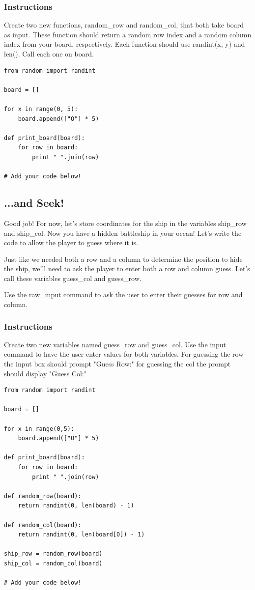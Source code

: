 \documentclass[12pt,a4paper,final,twoside,onecolumn,titlepage]{book}
\begin{document}
\subsubsection{Instructions}

Create two new functions, random\_row and random\_col, that both take board as input. These function should return a random row index and a random column index from your board, respectively. Each function should use randint(x, y) and len(). Call each one on board.

\begin{lstlisting}
from random import randint 

board = []

for x in range(0, 5):
    board.append(["O"] * 5)

def print_board(board):
    for row in board:
        print " ".join(row)

# Add your code below!
\end{lstlisting}

\subsection{...and Seek!}

Good job! For now, let's store coordinates for the ship in the variables ship\_row and ship\_col. Now you have a hidden battleship in your ocean! Let's write the code to allow the player to guess where it is.

Just like we needed both a row and a column to determine the position to hide the ship, we'll need to ask the player to enter both a row and column guess. Let's call these variables guess\_col and guess\_row.

Use the raw\_input command to ask the user to enter their guesses for row and column.
\subsubsection{Instructions}

Create two new variables named guess\_row and guess\_col. Use the input command to have the user enter values for both variables. For guessing the row the input box should prompt "Guess Row:" for guessing the col the prompt should display "Guess Col:"

\begin{lstlisting}
from random import randint

board = []

for x in range(0,5):
    board.append(["O"] * 5)

def print_board(board):
    for row in board:
        print " ".join(row)

def random_row(board):
    return randint(0, len(board) - 1)

def random_col(board):
    return randint(0, len(board[0]) - 1)

ship_row = random_row(board)
ship_col = random_col(board)

# Add your code below!

\end{lstlisting}
\end{document}

